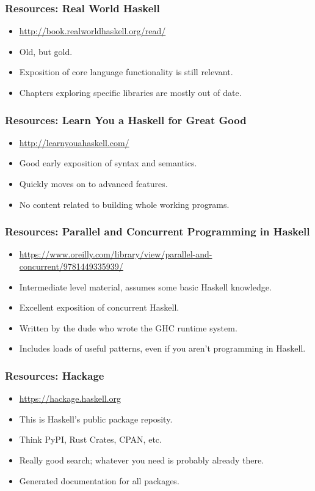 \documentclass{beamer}
\begin{document}
\begin{frame}
\frametitle{Resources: Real World Haskell}
\begin{itemize}
\item \url{http://book.realworldhaskell.org/read/}
\item Old, but gold.
\item Exposition of core language functionality is still relevant.
\item Chapters exploring specific libraries are mostly out of date.
\end{itemize}
\end{frame}

\begin{frame}
\frametitle{Resources: Learn You a Haskell for Great Good}
\begin{itemize}
\item \url{http://learnyouahaskell.com/}
\item Good early exposition of syntax and semantics.
\item Quickly moves on to advanced features.
\item No content related to building whole working programs.
\end{itemize}
\end{frame}

\begin{frame}
\frametitle{Resources: Parallel and Concurrent Programming in
            Haskell
           }
\begin{itemize}
\item \url{https://www.oreilly.com/library/view/parallel-and-concurrent/9781449335939/}
\item Intermediate level material, assumes some basic Haskell knowledge.
\item Excellent exposition of concurrent Haskell.
\item Written by the dude who wrote the GHC runtime system.
\item Includes loads of useful patterns, even if you aren't programming in
      Haskell.
\end{itemize}
\end{frame}

\begin{frame}
\frametitle{Resources: Hackage}
\begin{itemize}
\item \url{https://hackage.haskell.org}
\item This is Haskell's public package reposity.
\item Think PyPI, Rust Crates, CPAN, etc.
\item Really good search; whatever you need is probably already there.
\item Generated documentation for all packages.
\end{itemize}
\end{frame}
\end{document}
